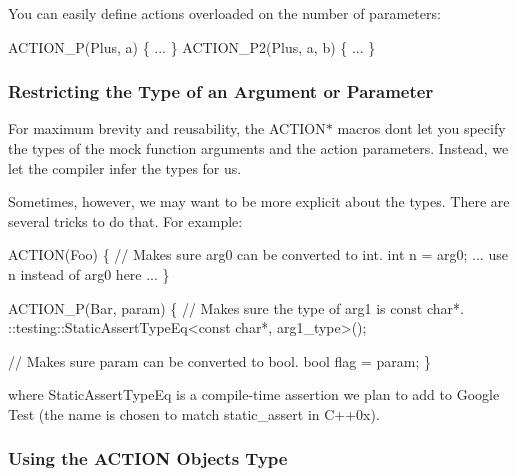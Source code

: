 You can easily define actions overloaded on the number of parameters\+: 
\begin{DoxyCode}
ACTION\_P(Plus, a) \{ ... \}
ACTION\_P2(Plus, a, b) \{ ... \}
\end{DoxyCode}


\subsubsection*{Restricting the Type of an Argument or Parameter}

For maximum brevity and reusability, the {\ttfamily A\+C\+T\+I\+O\+N$\ast$} macros don\textquotesingle{}t let you specify the types of the mock function arguments and the action parameters. Instead, we let the compiler infer the types for us.

Sometimes, however, we may want to be more explicit about the types. There are several tricks to do that. For example\+: 
\begin{DoxyCode}
ACTION(Foo) \{
  \textcolor{comment}{// Makes sure arg0 can be converted to int.}
  \textcolor{keywordtype}{int} n = arg0;
  ... use n instead of arg0 here ...
\}

ACTION\_P(Bar, param) \{
  \textcolor{comment}{// Makes sure the type of arg1 is const char*.}
  ::testing::StaticAssertTypeEq<const char*, arg1\_type>();

  \textcolor{comment}{// Makes sure param can be converted to bool.}
  \textcolor{keywordtype}{bool} flag = param;
\}
\end{DoxyCode}
 where {\ttfamily Static\+Assert\+Type\+Eq} is a compile-\/time assertion we plan to add to Google Test (the name is chosen to match {\ttfamily static\+\_\+assert} in C++0x).

\subsubsection*{Using the A\+C\+T\+I\+ON Object\textquotesingle{}s Type}

